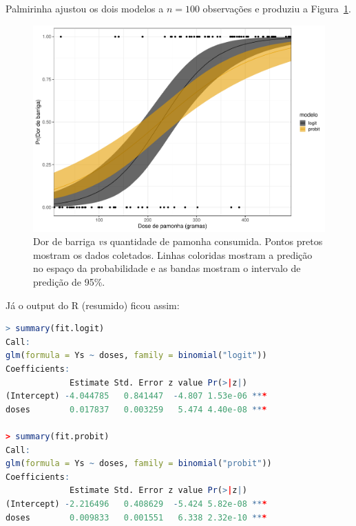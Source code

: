 \documentclass[a4paper,10pt, notitlepage]{report}
\begin{document}
Palmirinha ajustou os dois modelos a $n=100$ observações e produziu a Figura~\ref{fig:dor_pamonha}.
\begin{figure}[ht]
    \centering
    \includegraphics[scale=0.4]{figuras/palmirinha_dor.pdf}
    \caption{Dor de barriga \textit{vs} quantidade de pamonha consumida. Pontos pretos mostram os dados coletados. Linhas coloridas mostram a predição no espaço da probabilidade e as bandas mostram o intervalo de predição de 95\%.}
    \label{fig:dor_pamonha}
\end{figure}
Já o output do R (resumido) ficou assim:
\begin{center}
\begin{lstlisting}[language=R]
> summary(fit.logit)
Call:
glm(formula = Ys ~ doses, family = binomial("logit"))
Coefficients:
             Estimate Std. Error z value Pr(>|z|)    
(Intercept) -4.044785   0.841447  -4.807 1.53e-06 ***
doses        0.017837   0.003259   5.474 4.40e-08 ***

> summary(fit.probit)
Call:
glm(formula = Ys ~ doses, family = binomial("probit"))
Coefficients:
             Estimate Std. Error z value Pr(>|z|)    
(Intercept) -2.216496   0.408629  -5.424 5.82e-08 ***
doses        0.009833   0.001551   6.338 2.32e-10 ***
\end{lstlisting}    
\end{center}
\end{document}
